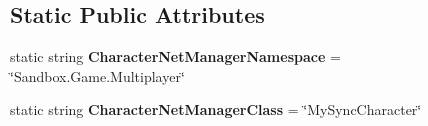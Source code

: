 \subsection*{Static Public Attributes}
\begin{DoxyCompactItemize}
\item 
\hypertarget{class_s_e_mod_a_p_i_internal_1_1_a_p_i_1_1_entity_1_1_sector_1_1_sector_object_1_1_character_entity_network_manager_a28bb7f8872e086d663c367e3e2a8eb84}{}static string {\bfseries Character\+Net\+Manager\+Namespace} = \char`\"{}Sandbox.\+Game.\+Multiplayer\char`\"{}\label{class_s_e_mod_a_p_i_internal_1_1_a_p_i_1_1_entity_1_1_sector_1_1_sector_object_1_1_character_entity_network_manager_a28bb7f8872e086d663c367e3e2a8eb84}

\item 
\hypertarget{class_s_e_mod_a_p_i_internal_1_1_a_p_i_1_1_entity_1_1_sector_1_1_sector_object_1_1_character_entity_network_manager_a3a70f7641cbfa49860f259ac3eb4abb1}{}static string {\bfseries Character\+Net\+Manager\+Class} = \char`\"{}My\+Sync\+Character\char`\"{}\label{class_s_e_mod_a_p_i_internal_1_1_a_p_i_1_1_entity_1_1_sector_1_1_sector_object_1_1_character_entity_network_manager_a3a70f7641cbfa49860f259ac3eb4abb1}

\end{DoxyCompactItemize}
